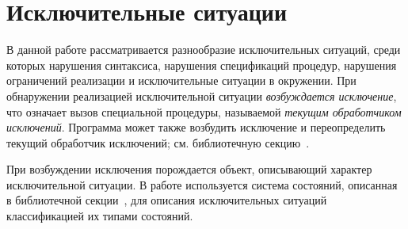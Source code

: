 \section{Исключительные ситуации}
\label{exceptionalsituationsection}

В данной работе рассматривается разнообразие исключительных
ситуаций, среди которых нарушения синтаксиса, нарушения спецификаций процедур, нарушения
ограничений реализации и исключительные ситуации в окружении. При обнаружении реализацией
исключительной ситуации \textit{возбуждается исключение}, что
означает вызов специальной процедуры, называемой \textit{текущим обработчиком исключений}.
Программа может также возбудить исключение и переопределить текущий обработчик
исключений; см. библиотечную секцию~.

При возбуждении исключения порождается объект, описывающий характер исключительной ситуации. В
работе используется система состояний, описанная в библиотечной
секции~, для описания исключительных ситуаций
классификацией их типами состояний.

